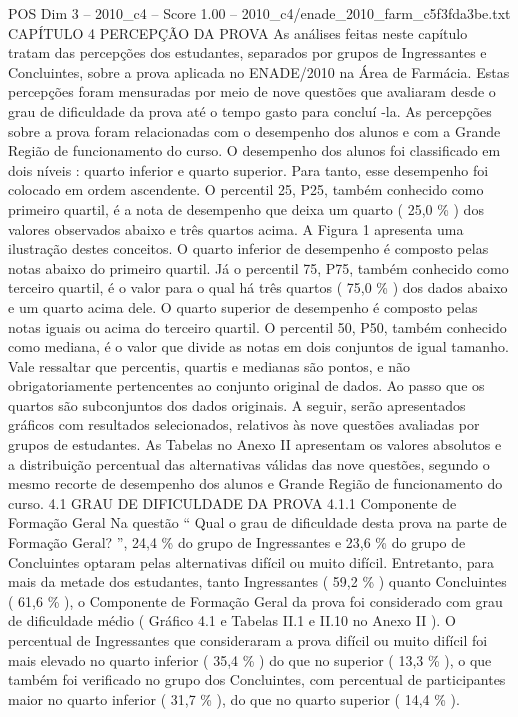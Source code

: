 \begin{textsample}{POS Dim 3 – 2010\_c4 – Score 1.00 – 2010\_c4/enade\_2010\_farm\_c5f3fda3be.txt}  \label{ex:f3_pos_146}
CAPÍTULO 4 PERCEPÇÃO DA PROVA As análises feitas neste capítulo tratam das percepções dos estudantes, separados por grupos de Ingressantes e Concluintes, sobre a prova aplicada no ENADE/2010 na Área de Farmácia.
Estas percepções foram mensuradas por meio de nove questões que avaliaram desde o grau de dificuldade da prova até o tempo gasto para concluí -la.
As percepções sobre a prova foram relacionadas com o desempenho dos alunos e com a Grande Região de funcionamento do curso.
O desempenho dos alunos foi classificado em dois níveis : quarto inferior e quarto superior.
Para tanto, esse desempenho foi colocado em ordem ascendente.
O percentil 25, P25, também conhecido como primeiro quartil, é a nota de desempenho que deixa um quarto ( 25,0 \% ) dos valores observados abaixo e três quartos acima.
A Figura 1 apresenta uma ilustração destes conceitos.
O quarto inferior de desempenho é composto pelas notas abaixo do primeiro quartil.
Já o percentil 75, P75, também conhecido como terceiro quartil, é o valor para o qual há três quartos ( 75,0 \% ) dos dados abaixo e um quarto acima dele.
O quarto superior de desempenho é composto pelas notas iguais ou acima do terceiro quartil.
O percentil 50, P50, também conhecido como mediana, é o valor que divide as notas em dois conjuntos de igual tamanho.
Vale ressaltar que percentis, quartis e medianas são pontos, e não obrigatoriamente pertencentes ao conjunto original de dados.
Ao passo que os quartos são subconjuntos dos dados originais.
A seguir, serão apresentados gráficos com resultados selecionados, relativos às nove questões avaliadas por grupos de estudantes.
As Tabelas no Anexo II apresentam os valores absolutos e a distribuição percentual das alternativas válidas das nove questões, segundo o mesmo recorte de desempenho dos alunos e Grande Região de funcionamento do curso. 4.1 GRAU DE DIFICULDADE DA PROVA 4.1.1 Componente de Formação Geral Na questão “ Qual o grau de dificuldade desta prova na parte de Formação Geral? ”, 24,4 \% do grupo de Ingressantes e 23,6 \% do grupo de Concluintes optaram pelas alternativas difícil ou muito difícil.
Entretanto, para mais da metade dos estudantes, tanto Ingressantes ( 59,2 \% ) quanto Concluintes ( 61,6 \% ), o Componente de Formação Geral da prova foi considerado com grau de dificuldade médio ( Gráfico 4.1 e Tabelas II.1 e II.10 no Anexo II ).
O percentual de Ingressantes que consideraram a prova difícil ou muito difícil foi mais elevado no quarto inferior ( 35,4 \% ) do que no superior ( 13,3 \% ), o que também foi verificado no grupo dos Concluintes, com percentual de participantes maior no quarto inferior ( 31,7 \% ), do que no quarto superior ( 14,4 \% ).

\end{textsample}
